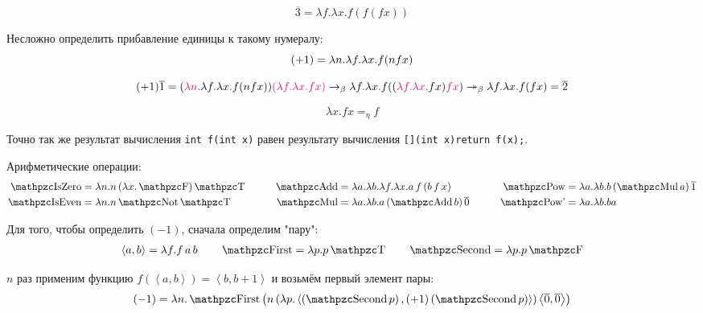 \begin{example}
\[
    \overline{3} = \lambda f . \lambda x . f (f (f x))
\]
\end{example}

Несложно определить прибавление единицы к такому нумералу:
\[
    (+1) = \lambda{}n.\lambda{}f.\lambda{}x.f(nfx) \\
\]
\begin{example}
    \[
        (+1) \overline{1} =
        (\reduction{\lambda n} . \lambda f . \lambda x . f (n f x)) \reduction{(\lambda f . \lambda x . f x)} \rightarrow_{\beta}
        \lambda f . \lambda x . f ((\reduction{\lambda f . \lambda x} . f x) \reduction{f x}) \twoheadrightarrow_{\beta}
        \lambda f . \lambda x . f (f x) =
        \overline{2}
    \]
\end{example}

\begin{definition}
    \[
        \lambda x . f x =_{\eta} f
    \]
\end{definition}
Точно так же результат вычисления \texttt{int f(int x)} равен результату вычисления \texttt{[](int x){return f(x);}}.

Арифметические операции:
\begin{align*}
    \comb{IsZero} &= \lambda{}n.n\mathinner{(\lambda{}x.\F)}\T &\qquad
    \comb{Add}    &= \lambda{}a.\lambda{}b.\lambda{}f.\lambda{}x.a \mathinner{f} (b \mathinner{f} x) &\qquad
    \comb{Pow}    &= \lambda{}a.\lambda{}b.b \mathinner{(\comb{Mul} a)} \mathinner{\overline{1}} \\
    \comb{IsEven} &= \lambda{}n.n \Not \T &\qquad
    \comb{Mul}    &= \lambda{}a.\lambda{}b.a \mathinner{(\comb{Add} b)} \mathinner{\overline{0}} &\qquad
    \comb{Pow'}   &= \lambda{}a.\lambda{}b.b a
\end{align*}

Для того, чтобы определить $(-1)$, сначала определим "пару":
\begin{align*}
    \left<a,b\right> = \lambda f.f \mathinner{a} b \qquad
    \comb{First} = \lambda p . p \T \qquad
    \comb{Second} = \lambda p . p \F
\end{align*}

$n$ раз применим функцию $f\left(\left<a,b\right>\right) = \left<b,b+1\right>$ и возьмём первый элемент пары:
\[
    (-1) = \lambda n . \comb{First}
        \left(n \mathinner{(\lambda p . \left<\left(\comb{Second} p\right), \mathinner{(+1)} (\comb{Second} p)\right>)}
        \left<\overline{0},\overline{0}\right>\right)
\]

